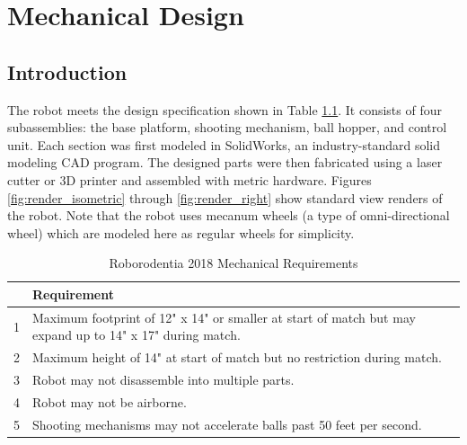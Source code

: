 \chapter{Mechanical Design}
\section{Introduction}
The robot meets the design specification shown in Table \ref{tab:roborodentia_reqs}. It consists of four subassemblies: the base platform, shooting mechanism, ball hopper, and control unit. Each section was first modeled in SolidWorks, an industry-standard solid modeling CAD program. The designed parts were then fabricated using a laser cutter or 3D printer and assembled with metric hardware. Figures \ref{fig:render_isometric} through \ref{fig:render_right} show standard view renders of the robot. Note that the robot uses mecanum wheels (a type of omni-directional wheel) which are modeled here as regular wheels for simplicity.

\begin{table}[h]
	\centering	\caption{Roborodentia 2018 Mechanical Requirements}
	\begin{tabular}{cp{5in}}
		\hline 
		& Requirement \\ 
		\hline 
		1 & \ssp Maximum footprint of 12" x 14" or smaller at start of match but may expand up to 14" x 17" during match. \\ 
		\hline 
		2 & \ssp Maximum height of 14" at start of match but no restriction during match. \\ 
		\hline 
		3 & Robot may not disassemble into multiple parts. \\ 
		\hline 
		4 & Robot may not be airborne. \\ 
		\hline 
		5 & Shooting mechanisms may not accelerate balls past 50 feet per second. \\ 
		\hline 
	\end{tabular} 
	\label{tab:roborodentia_reqs}
\end{table}

